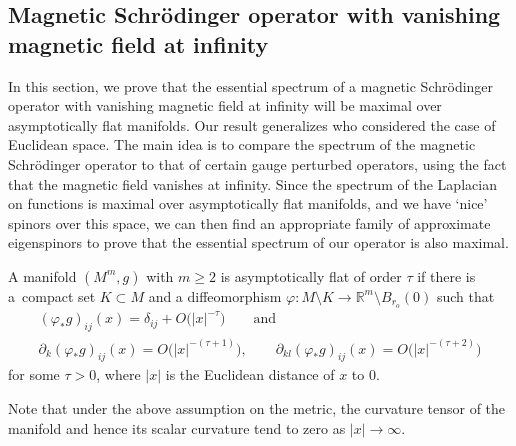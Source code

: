 \documentclass[pdftex]{sigma}
\numberwithin{equation}{section}
\begin{document}
\subsection{Magnetic Schr\"odinger operator with vanishing magnetic field at infinity}

In this section, we prove that the essential spectrum of a magnetic Schr\"odinger operator with vanishing magnetic field at infinity will be maximal over asymptotically flat manifolds. Our result generalizes \cite[Theorem~6.1]{CFKS} who considered the case of Euclidean space. The main idea is to compare the spectrum of the magnetic Schr\"odinger operator to that of certain gauge perturbed operators, using the fact that the magnetic field vanishes at infinity. Since the spectrum of the Laplacian on functions is maximal over asymptotically flat manifolds, and we have `nice' spinors over this space, we can then find an appropriate family of approximate eigenspinors to prove that the essential spectrum of our operator is also maximal.

\begin{Definition}
A manifold $(M^m,g)$ with $m\geq 2$ is asymptotically flat of order $\tau$ if there is a~compact set $K\subset M$ and a diffeomorphism
$\varphi\colon M \setminus K \to \mathbb{R}^m \setminus B_{r_o}(0)$ such that
\begin{gather*}
(\varphi_* g)_{ij} (x) = \delta_{ij} + O\bigl(|x|^{-\tau}\bigr) \qquad \text{and}\\
\partial_k (\varphi_* g)_{ij} (x) = O\bigr(|x|^{-(\tau+1)}\bigr), \qquad \partial_{kl} (\varphi_* g)_{ij} (x)= O\bigl(|x|^{-(\tau+2)}\bigr)
\end{gather*}
for some $\tau>0$, where $|x|$ is the Euclidean distance of $x$ to $0$.
\end{Definition}

Note that under the above assumption on the metric, the curvature tensor of the manifold and hence its scalar curvature tend to zero as $|x|\to \infty$.
\end{document}
